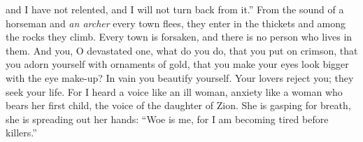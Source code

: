 \begin{biblechapter}
and I have not relented, and I will not turn back from it.”
\verse From the sound of a horseman and \textit{an archer} every town flees, 
they enter in the thickets and among the rocks they climb. 
Every town is forsaken, 
and there is no person who lives in them.
\verse And you, O devastated one, what do you do, 
that you put on crimson, 
that you adorn yourself with ornaments of gold, 
that you make your eyes look bigger with the eye make-up? 
In vain you beautify yourself. 
Your lovers reject you; 
they seek your life.
\verse For I heard a voice like an ill woman, 
anxiety like a woman who bears her first child, 
the voice of the daughter of Zion. 
She is gasping for breath, 
she is spreading out her hands: 
“Woe is me, for I am becoming tired before killers.”
\end{biblechapter}

